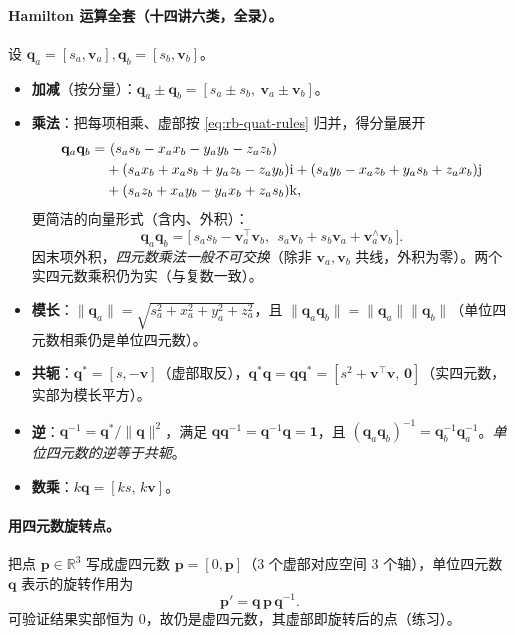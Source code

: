 \paragraph{Hamilton 运算全套（十四讲六类，全录）。}设 $\mathbf{q}_a=[s_a,\mathbf{v}_a],\mathbf{q}_b=[s_b,\mathbf{v}_b]$。
\begin{itemize}
\item \textbf{加减}（按分量）：$\mathbf{q}_a\pm\mathbf{q}_b=[s_a\pm s_b,\ \mathbf{v}_a\pm\mathbf{v}_b]$。
\item \textbf{乘法}：把每项相乘、虚部按 \cref{eq:rb-quat-rules} 归并，得分量展开
\begin{align}
  \mathbf{q}_a\mathbf{q}_b=&\ (s_as_b-x_ax_b-y_ay_b-z_az_b)\notag\\
  &+(s_ax_b+x_as_b+y_az_b-z_ay_b)\mathrm{i}+(s_ay_b-x_az_b+y_as_b+z_ax_b)\mathrm{j}\notag\\
  &+(s_az_b+x_ay_b-y_ax_b+z_as_b)\mathrm{k},
\end{align}
更简洁的向量形式（含内、外积）：
\begin{equation}
  \mathbf{q}_a\mathbf{q}_b=\big[\,s_as_b-\mathbf{v}_a^\top\mathbf{v}_b,\ \ s_a\mathbf{v}_b+s_b\mathbf{v}_a+\mathbf{v}_a^\wedge\mathbf{v}_b\,\big].
  \label{eq:quat-mul}
\end{equation}
因末项外积，\emph{四元数乘法一般不可交换}（除非 $\mathbf{v}_a,\mathbf{v}_b$ 共线，外积为零）。两个实四元数乘积仍为实（与复数一致）。
\item \textbf{模长}：$\|\mathbf{q}_a\|=\sqrt{s_a^2+x_a^2+y_a^2+z_a^2}$，且 $\|\mathbf{q}_a\mathbf{q}_b\|=\|\mathbf{q}_a\|\|\mathbf{q}_b\|$（单位四元数相乘仍是单位四元数）。
\item \textbf{共轭}：$\mathbf{q}^*=[s,-\mathbf{v}]$（虚部取反），$\mathbf{q}^*\mathbf{q}=\mathbf{q}\mathbf{q}^*=[s^2+\mathbf{v}^\top\mathbf{v},\,\mathbf{0}]$（实四元数，实部为模长平方）。
\item \textbf{逆}：$\mathbf{q}^{-1}=\mathbf{q}^*/\|\mathbf{q}\|^2$，满足 $\mathbf{q}\mathbf{q}^{-1}=\mathbf{q}^{-1}\mathbf{q}=\mathbf{1}$，且 $(\mathbf{q}_a\mathbf{q}_b)^{-1}=\mathbf{q}_b^{-1}\mathbf{q}_a^{-1}$。\emph{单位四元数的逆等于共轭}。
\item \textbf{数乘}：$k\mathbf{q}=[ks,\,k\mathbf{v}]$。
\end{itemize}

\paragraph{用四元数旋转点。}把点 $\mathbf{p}\in\mathbb{R}^3$ 写成虚四元数 $\mathbf{p}=[0,\mathbf{p}]$（$3$ 个虚部对应空间 $3$ 个轴），单位四元数 $\mathbf{q}$ 表示的旋转作用为
\begin{equation}
  \mathbf{p}'=\mathbf{q}\,\mathbf{p}\,\mathbf{q}^{-1}.
  \label{eq:quat-rot}
\end{equation}
可验证结果实部恒为 $0$，故仍是虚四元数，其虚部即旋转后的点（练习）。

